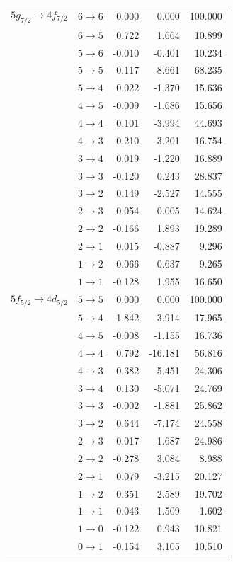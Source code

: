 \begin{longtable}{cc|rrr}
$5g_{7/2} \rightarrow 4f_{7/2}$  &  $6 \rightarrow 6$  &  0.000  &  0.000  &  100.000\\
&  $6 \rightarrow 5$  &  0.722  &  1.664  &  10.899\\
&  $5 \rightarrow 6$  &  -0.010  &  -0.401  &  10.234\\
&  $5 \rightarrow 5$  &  -0.117  &  -8.661  &  68.235\\
&  $5 \rightarrow 4$  &  0.022  &  -1.370  &  15.636\\
&  $4 \rightarrow 5$  &  -0.009  &  -1.686  &  15.656\\
&  $4 \rightarrow 4$  &  0.101  &  -3.994  &  44.693\\
&  $4 \rightarrow 3$  &  0.210  &  -3.201  &  16.754\\
&  $3 \rightarrow 4$  &  0.019  &  -1.220  &  16.889\\
&  $3 \rightarrow 3$  &  -0.120  &  0.243  &  28.837\\
&  $3 \rightarrow 2$  &  0.149  &  -2.527  &  14.555\\
&  $2 \rightarrow 3$  &  -0.054  &  0.005  &  14.624\\
&  $2 \rightarrow 2$  &  -0.166  &  1.893  &  19.289\\
&  $2 \rightarrow 1$  &  0.015  &  -0.887  &  9.296\\
&  $1 \rightarrow 2$  &  -0.066  &  0.637  &  9.265\\
&  $1 \rightarrow 1$  &  -0.128  &  1.955  &  16.650\\[7pt]

$5f_{5/2} \rightarrow 4d_{5/2}$  &  $5 \rightarrow 5$  &  0.000  &  0.000  &  100.000\\
&  $5 \rightarrow 4$  &  1.842  &  3.914  &  17.965\\
&  $4 \rightarrow 5$  &  -0.008  &  -1.155  &  16.736\\
&  $4 \rightarrow 4$  &  0.792  &  -16.181  &  56.816\\
&  $4 \rightarrow 3$  &  0.382  &  -5.451  &  24.306\\
&  $3 \rightarrow 4$  &  0.130  &  -5.071  &  24.769\\
&  $3 \rightarrow 3$  &  -0.002  &  -1.881  &  25.862\\
&  $3 \rightarrow 2$  &  0.644  &  -7.174  &  24.558\\
&  $2 \rightarrow 3$  &  -0.017  &  -1.687  &  24.986\\
&  $2 \rightarrow 2$  &  -0.278  &  3.084  &  8.988\\
&  $2 \rightarrow 1$  &  0.079  &  -3.215  &  20.127\\
&  $1 \rightarrow 2$  &  -0.351  &  2.589  &  19.702\\
&  $1 \rightarrow 1$  &  0.043  &  1.509  &  1.602\\
&  $1 \rightarrow 0$  &  -0.122  &  0.943  &  10.821\\
&  $0 \rightarrow 1$  &  -0.154  &  3.105  &  10.510
\end{longtable}
\clearpage
